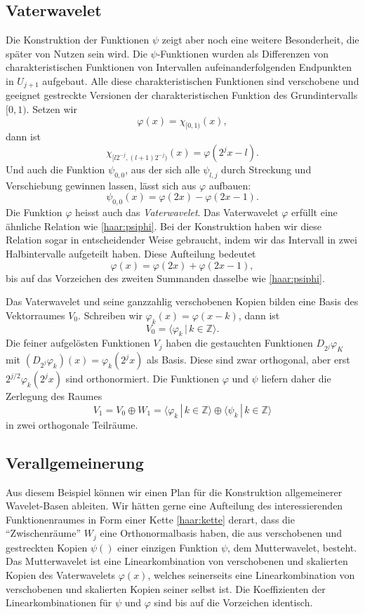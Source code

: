 \subsection{Vaterwavelet}
Die Konstruktion der Funktionen $\psi$ zeigt aber noch eine weitere 
Besonderheit, die später von Nutzen sein wird.
Die $\psi$-Funktionen wurden als Differenzen von charakteristischen
Funktionen von Intervallen aufeinanderfolgenden Endpunkten in $U_{j+1}$
aufgebaut.
Alle diese charakteristischen Funktionen sind verschobene und geeignet
gestreckte Versionen der charakteristischen Funktion des Grundintervalls
$[0,1)$.
Setzen wir
\[
\varphi(x) = \chi_{[0,1)} (x),
\]
dann ist
\[
\chi_{[l2^{-j},(l+1)2^{-j})}(x)
=
\varphi(2^jx-l).
\]
Und auch die Funktion $\psi_{0,0}$, aus der sich alle $\psi_{l,j}$ durch
Streckung und Verschiebung gewinnen lassen, lässt sich aus $\varphi$
aufbauen:
\begin{equation}
\psi_{0,0}(x) = \varphi(2x) - \varphi(2x - 1).
\label{haar:psiphi}
\end{equation}
Die Funktion $\varphi$ heisst auch das {\em Vaterwavelet}.
Das Vaterwavelet $\varphi$ erfüllt eine ähnliche Relation
wie \eqref{haar:psiphi}.
Bei der Konstruktion haben wir diese Relation sogar in entscheidender
Weise gebraucht, indem wir das Intervall in zwei Halbintervalle aufgeteilt
haben.
Diese Aufteilung bedeutet
\[
\varphi(x) = \varphi(2x) + \varphi(2x-1),
\]
bis auf das Vorzeichen des zweiten Summanden dasselbe wie 
\eqref{haar:psiphi}.

Das Vaterwavelet und seine ganzzahlig verschobenen Kopien bilden
eine Basis des Vektorraumes $V_0$.
Schreiben wir $\varphi_k(x)=\varphi(x-k)$, dann ist
\[
V_0 = \langle \varphi_k\,|\, k\in\mathbb Z\rangle.
\]
Die feiner aufgelösten Funktionen $V_j$ haben die gestauchten Funktionen
$D_{2^j}\varphi_K$ mit
$(D_{2^j}\varphi_k)(x)=\varphi_k(2^jx)$ als Basis.
Diese sind zwar orthogonal, aber erst $2^{j/2}\varphi_k(2^jx)$ sind
orthonormiert.
Die Funktionen $\varphi$ und $\psi$ liefern daher die Zerlegung
des Raumes
\[
V_1
=
V_0 \oplus W_1
=
\langle \varphi_k\,|\,k\in\mathbb Z\rangle
\oplus
\langle \psi_k\,|\,k\in\mathbb Z\rangle
\]
in zwei orthogonale Teilräume.

\subsection{Verallgemeinerung}
Aus diesem Beispiel können wir einen Plan für die Konstruktion allgemeinerer
Wavelet-Basen ableiten.
Wir hätten gerne eine Aufteilung des interessierenden Funktionenraumes
in Form einer Kette \eqref{haar:kette} derart, dass die ``Zwischenräume''
$W_j$ eine Orthonormalbasis haben, die aus verschobenen und gestreckten
Kopien
$\psi()$
einer einzigen Funktion $\psi$, dem Mutterwavelet, besteht.
Das Mutterwavelet ist eine Linearkombination von verschobenen
und skalierten Kopien des Vaterwavelets $\varphi(x)$, welches seinerseits
eine Linearkombination von verschobenen und skalierten Kopien seiner
selbst ist.
Die Koeffizienten der Linearkombinationen für $\psi$ und $\varphi$ sind
bis auf die Vorzeichen identisch.




